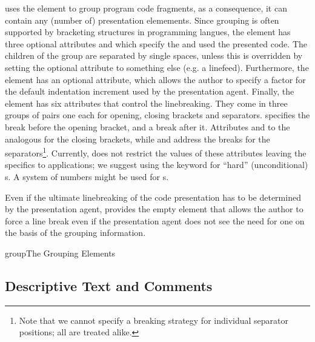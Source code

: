 {\codeml} uses the {} element to group program code fragments, as a
consequence, it can contain any (number of) presentation {\codeml} elemements.
Since grouping is often supported by bracketing structures in programming langues,
the {} element has three optional attributes {}
and {} which specify the {} and
{} {} used the presented code. The children
of the group are separated by single spaces, unless this is overridden by setting
the optional {} attribute to something else (e.g. a
linefeed).  Furthermore, the {} element has an optional
{} attribute, which allows the author to specify a factor
for the default indentation increment used by the presentation agent. Finally, the
{} element has six attributes that control the linebreaking. They
come in three groups of pairs one each for opening, closing brackets and
separators. {} specifies the break before the opening
bracket, and {} a break after it. Attributes
{} and {} to the analogous for the
closing brackets, while {} and {}
address the breaks for the separators\footnote{Note that we cannot specify a
  breaking strategy for individual separator positions; all are treated alike.}.
Currently, {\codeml} does not restrict the values of these attributes leaving the
specifics to applications; we suggest using the keyword {} for ``hard''
(unconditional) {s}. A system of numbers might be used for
{s}.

Even if the ultimate linebreaking of the code presentation has to be determined by
the presentation agent, {\codeml} provides the empty {} element that
allows the author to force a line break even if the presentation agent does not
see the need for one on the basis of the grouping information.
\begin{myfig}{group}{The {\codeml} Grouping Elements}
  \quicktable{\grouptable{}}
\end{myfig}

\subsection{Descriptive Text and Comments}\label{sec:pres:text}

